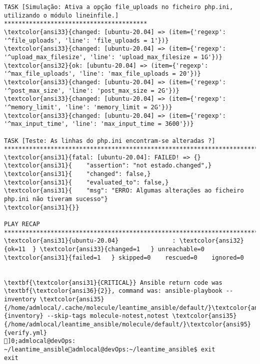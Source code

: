 \documentclass{scrartcl}
\begin{document}
\begin{Verbatim}
TASK [Simulação: Ativa a opção file_uploads no ficheiro php.ini, utilizando o módulo lineinfile.] ****************************************
\textcolor{ansi33}{changed: [ubuntu-20.04] => (item={'regexp': '^file_uploads', 'line': 'file_uploads = 1'})}
\textcolor{ansi33}{changed: [ubuntu-20.04] => (item={'regexp': '^upload_max_filesize', 'line': 'upload_max_filesize = 1G'})}
\textcolor{ansi32}{ok: [ubuntu-20.04] => (item={'regexp': '^max_file_uploads', 'line': 'max_file_uploads = 20'})}
\textcolor{ansi33}{changed: [ubuntu-20.04] => (item={'regexp': '^post_max_size', 'line': 'post_max_size = 2G'})}
\textcolor{ansi33}{changed: [ubuntu-20.04] => (item={'regexp': '^memory_limit', 'line': 'memory_limit = 2G'})}
\textcolor{ansi33}{changed: [ubuntu-20.04] => (item={'regexp': '^max_input_time', 'line': 'max_input_time = 3600'})}

TASK [Teste: As linhas do php.ini encontram-se alteradas ?] ******************************************************************************
\textcolor{ansi31}{fatal: [ubuntu-20.04]: FAILED! => {}
\textcolor{ansi31}{    "assertion": "not estado.changed",}
\textcolor{ansi31}{    "changed": false,}
\textcolor{ansi31}{    "evaluated_to": false,}
\textcolor{ansi31}{    "msg": "ERRO: Algumas alterações ao ficheiro php.ini não tiveram sucesso"}
\textcolor{ansi31}{}}

PLAY RECAP *******************************************************************************************************************************
\textcolor{ansi31}{ubuntu-20.04}               : \textcolor{ansi32}{ok=11  } \textcolor{ansi33}{changed=1   } unreachable=0    \textcolor{ansi31}{failed=1   } skipped=0    rescued=0    ignored=0


\textbf{\textcolor{ansi31}{CRITICAL}} Ansible return code was \textbf{\textcolor{ansi36}{2}}, command was: ansible-playbook --inventory \textcolor{ansi35}{/home/admlocal/.cache/molecule/leantime_ansible/default/}\textcolor{ansi95}{inventory} --skip-tags molecule-notest,notest \textcolor{ansi35}{/home/admlocal/leantime_ansible/molecule/default/}\textcolor{ansi95}{verify.yml}
]0;admlocal@devOps: ~/leantime_ansibleadmlocal@devOps:~/leantime_ansible$ exit
exit

\end{Verbatim}
\end{document}
